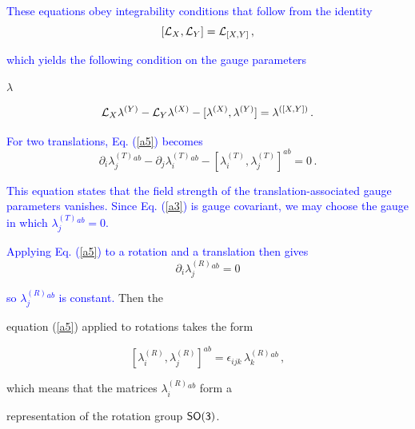 \documentclass [prd,reprint,eqsecnum,nofootinbib]  {revtex4-1}
\newcommand{\corr}[1]{\textcolor{blue}{#1}}
\begin{document}
\corr{These equations obey integrability conditions that follow from
the identity}
$$

[{\cal L}_X, {\cal L}_Y] = {\cal L}_{[X,Y]}\, ,

$$

\corr{which yields the following condition on the gauge parameters}

$\lambda$

\begin{equation}\label{a5}

{\cal L}_X\lambda^{(Y)}-{\cal L}_Y\lambda^{(X)}

-[\lambda^{(X)},\lambda^{(Y)}] =\lambda^{([X,Y])}\,.

\end{equation}

\corr{For two translations, Eq. (\ref{a5}) becomes}
\begin{equation}\label{a6}

    \partial_i\lambda^{(T)}_j{}^{ab}-

    \partial_j\lambda^{(T)}_i{}^{ab} -

    [\lambda^{(T)}_i,\lambda^{(T)}_j]^{ab}=0\, .

\end{equation}

\corr{This equation states that the field strength of the
translation-associated gauge parameters vanishes. Since Eq.
(\ref{a3}) is gauge covariant, we may choose the gauge in which
$\lambda^{(T)}_j{}^{ab}=0$.}

\corr{Applying Eq. (\ref{a5}) to a rotation and a translation then
gives}
$$

\partial_i\lambda^{(R)}_j{}^{ab}=0

$$

\corr{so $\lambda^{(R)}_j{}^{ab}$ is constant.} Then the

equation (\ref{a5}) applied to rotations takes the form

\begin{equation}\label{a7}

    [\lambda^{(R)}_i,\lambda^{(R)}_j]^{ab}=\epsilon_{ijk}\,

    \lambda^{(R)}_k{}^{ab}\,,

\end{equation}

which means that the matrices $\lambda^{(R)}_i{}^{ab}$ form a

representation of the rotation group $\sf{SO(3)}$.
\end{document}
